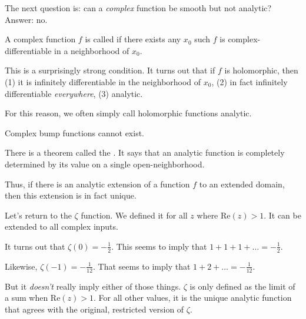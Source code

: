 \documentclass[11pt, oneside]{amsart}
\begin{document}
\begin{remark}
  The next question is: can a \emph{complex} function be smooth but not
  analytic? Answer: no.
\end{remark}

\begin{definition}
  A complex function $f$ is called  if there exists
  any $x_0$ such $f$ is complex-differentiable in a neighborhood of
  $x_0$.
\end{definition}

\begin{remark}
  This is a surprisingly strong condition. It turns out that if $f$ is
  holomorphic, then (1) it is infinitely differentiable in the
  neighborhood of $x_0$, (2) in fact infinitely differentiable
  \emph{everywhere}, (3) analytic.

  For this reason, we often simply call holomorphic functions analytic.
\end{remark}

\begin{remark}
  Complex bump functions cannot exist.
\end{remark}

\begin{remark}
  There is a theorem called the . It says that
  an analytic function is completely determined by its value on a single
  open-neighborhood.

  Thus, if there is an analytic extension of a function $f$ to an
  extended domain, then this extension is in fact unique.
\end{remark}

\begin{remark}
  Let's return to the $\zeta$ function. We defined it for all $z$ where
  $\text{Re}(z) > 1$. It can be extended to all complex inputs.
\end{remark}

\begin{remark}
  It turns out that $\zeta(0) = -\frac{1}{2}$. This seems to imply that
  $1 + 1 + 1 + \ldots = -\frac{1}{2}$.

  Likewise, $\zeta(-1) = -\frac{1}{12}$. That seems to imply that $1 + 2
  + \ldots = -\frac{1}{12}$.

  But it \emph{doesn't} really imply either of those things. $\zeta$ is
  only defined as the limit of a sum when $\text{Re}(z) > 1$. For all
  other values, it is the unique analytic function that agrees with the
  original, restricted version of $\zeta$.
\end{remark}
\end{document}
